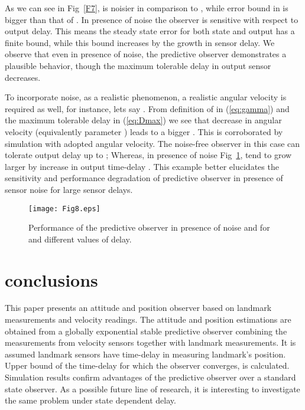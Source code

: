 \documentclass[12pt,draftcls,onecolumn]{IEEEtran}
\begin{document}
As we can see in Fig~\ref{F7},  is noisier in comparison to , while error bound in  is bigger than that of . In presence of noise the observer is sensitive with respect to output delay. This means the steady state error for both state and output has a finite bound, while this bound increases by the growth in sensor delay. We observe that even in presence of noise, the predictive observer demonstrates a plausible behavior, though the maximum tolerable delay in output sensor decreases.

To incorporate noise, as a realistic phenomenon, a realistic angular velocity is required as well, for instance, lets say . From definition of  in (\ref{eq:gamma}) and the maximum tolerable delay in (\ref{eq:Dmax}) we see that decrease in angular velocity (equivalently parameter ) leads to a bigger . This is corroborated by simulation with adopted angular velocity. The noise-free observer in this case can tolerate output delay up to ; Whereas, in presence of noise Fig~\ref{F8},  tend to grow larger by increase in output time-delay . This example better elucidates the sensitivity and performance degradation of predictive observer in presence of sensor noise for large sensor delays.

\begin{figure}[thpb]
\centering
\texttt{[image: Fig8.eps]}
\caption{Performance of the predictive observer in presence of noise and for  and different values of delay.}
\label{F8}
\end{figure}

\section{conclusions }

This paper presents an attitude and position observer based on landmark measurements and velocity readings. The attitude and position estimations are obtained from a globally exponential stable predictive observer combining the measurements from velocity sensors together with landmark measurements. It is assumed landmark sensors have time-delay in measuring landmark's position. Upper bound of the time-delay for which the observer converges, is calculated. Simulation results confirm advantages of the predictive observer over a standard state observer. As a possible future line of research, it is interesting to investigate the same problem under state dependent delay.
\end{document}
